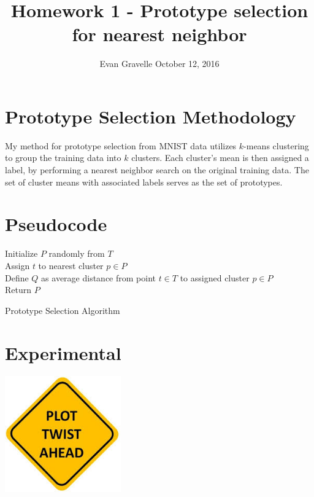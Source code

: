 \documentclass[letterpaper,10pt,onecolumn]{IEEEconf}
\begin{document}
\title{Homework 1 - Prototype selection for nearest neighbor}
\author{Evan Gravelle \quad \quad October 12, 2016}
\maketitle

\section{Prototype Selection Methodology}

My method for prototype selection from MNIST data utilizes $k$-means clustering to group the training data into $k$ clusters. Each cluster's mean is then assigned a label, by performing a nearest neighbor search on the original training data. The set of cluster means with associated labels serves as the set of prototypes.

\section{Pseudocode}

\begin{algorithm}[H]
\SetAlgoLined
\DontPrintSemicolon
{}
\BlankLine
Initialize $P$ randomly from $T$ \\
Assign $t$ to nearest cluster $p \in P$ \\
Define $Q$ as average distance from point $t \in T$ to assigned cluster $p \in P$ \\
Return $P$
\caption{Prototype Selection Algorithm}
\end{algorithm}

\section{Experimental}

\begin{center}\label{fig:plot}
\includegraphics[width=5cm]{img.jpg}
\end{center}
\end{document}
